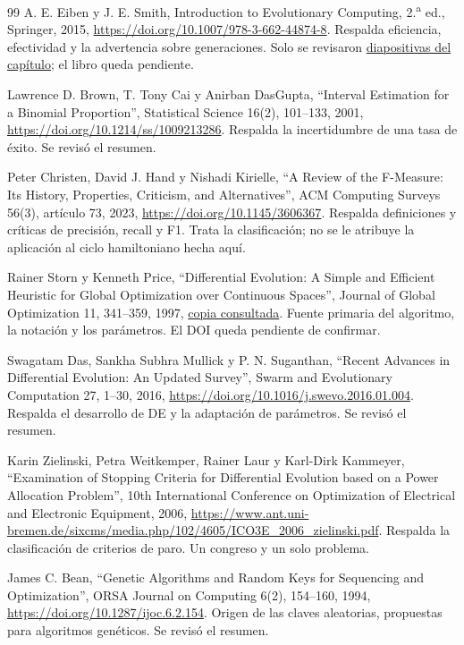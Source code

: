 \begin{thebibliography}{99}
A. E. Eiben y J. E. Smith, Introduction to Evolutionary Computing, 2.\textsuperscript{a} ed., Springer, 2015, \url{https://doi.org/10.1007/978-3-662-44874-8}. Respalda eficiencia, efectividad y la advertencia sobre generaciones. Solo se revisaron \href{https://cin.ufpe.br/~aluizioa/CE/CE-07-trabalhando-com-AEs-ch09-2014.pdf}{diapositivas del capítulo}; el libro queda pendiente.

Lawrence D. Brown, T. Tony Cai y Anirban DasGupta, ``Interval Estimation for a Binomial Proportion'', Statistical Science 16(2), 101--133, 2001, \url{https://doi.org/10.1214/ss/1009213286}. Respalda la incertidumbre de una tasa de éxito. Se revisó el resumen.

Peter Christen, David J. Hand y Nishadi Kirielle, ``A Review of the F-Measure: Its History, Properties, Criticism, and Alternatives'', ACM Computing Surveys 56(3), artículo 73, 2023, \url{https://doi.org/10.1145/3606367}. Respalda definiciones y críticas de precisión, recall y F1. Trata la clasificación; no se le atribuye la aplicación al ciclo hamiltoniano hecha aquí.

Rainer Storn y Kenneth Price, ``Differential Evolution: A Simple and Efficient Heuristic for Global Optimization over Continuous Spaces'', Journal of Global Optimization 11, 341--359, 1997, \href{https://www.cp.eng.chula.ac.th/~piak/teaching/ec/ec2012/storn_price_de.pdf}{copia consultada}. Fuente primaria del algoritmo, la notación y los parámetros. El DOI queda pendiente de confirmar.

Swagatam Das, Sankha Subhra Mullick y P. N. Suganthan, ``Recent Advances in Differential Evolution: An Updated Survey'', Swarm and Evolutionary Computation 27, 1--30, 2016, \url{https://doi.org/10.1016/j.swevo.2016.01.004}. Respalda el desarrollo de DE y la adaptación de parámetros. Se revisó el resumen.

Karin Zielinski, Petra Weitkemper, Rainer Laur y Karl-Dirk Kammeyer, ``Examination of Stopping Criteria for Differential Evolution based on a Power Allocation Problem'', 10th International Conference on Optimization of Electrical and Electronic Equipment, 2006, \url{https://www.ant.uni-bremen.de/sixcms/media.php/102/4605/ICO3E_2006_zielinski.pdf}. Respalda la clasificación de criterios de paro. Un congreso y un solo problema.

James C. Bean, ``Genetic Algorithms and Random Keys for Sequencing and Optimization'', ORSA Journal on Computing 6(2), 154--160, 1994, \url{https://doi.org/10.1287/ijoc.6.2.154}. Origen de las claves aleatorias, propuestas para algoritmos genéticos. Se revisó el resumen.


\end{thebibliography}
